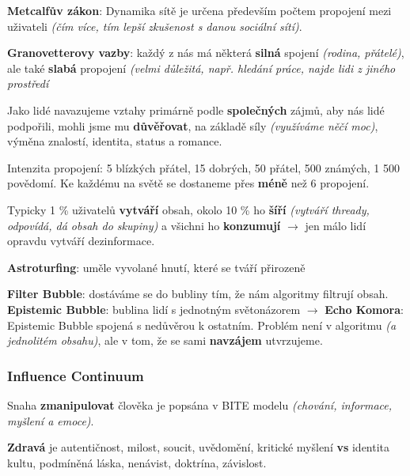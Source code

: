 \vspace{4pt}
\noindent \textbf{Metcalfův zákon}: Dynamika sítě je určena především počtem propojení mezi uživateli \textit{(čím více, tím lepší zkušenost s danou sociální sítí)}.

\vspace{4pt}
\noindent \textbf{Granovetterovy vazby}: každý z nás má některá \textbf{silná} spojení \textit{(rodina, přátelé)}, ale také \textbf{slabá} propojení \textit{(velmi důležitá, např. hledání práce, najde lidi z jiného prostředí}

\vspace{4pt}
\noindent Jako lidé navazujeme vztahy primárně podle \textbf{společných} zájmů, aby nás lidé podpořili, mohli jsme mu \textbf{důvěřovat}, na základě síly \textit{(využíváme něčí moc)}, výměna znalostí, identita, status a romance.

\vspace{4pt}
\noindent Intenzita propojení: 5 blízkých přátel, 15 dobrých, 50 přátel, 500 známých, 1 500 povědomí. Ke každému na světě se dostaneme přes \textbf{méně} než 6 propojení.

\vspace{4pt}
\noindent Typicky 1 \% uživatelů \textbf{vytváří} obsah, okolo 10 \% ho \textbf{šíří} \textit{(vytváří thready, odpovídá, dá obsah do skupiny)} a všichni ho \textbf{konzumují} $\to$ jen málo lidí opravdu vytváří dezinformace.

\vspace{4pt}
\noindent \textbf{Astroturfing}: uměle vyvolané hnutí, které se tváří přirozeně

\vspace{4pt}
\noindent \textbf{Filter Bubble}: dostáváme se do bubliny tím, že nám algoritmy filtrují obsah. \textbf{Epistemic Bubble}: bublina lidí s jednotným světonázorem $\to$ \textbf{Echo Komora}: Epistemic Bubble spojená s nedůvěrou k ostatním. Problém není v algoritmu \textit{(a jednolitém obsahu)}, ale v tom, že se sami \textbf{navzájem} utvrzujeme.

\subsubsection*{Influence Continuum}

Snaha \textbf{zmanipulovat} člověka je popsána v BITE modelu \textit{(chování, informace, myšlení a emoce)}.

\textbf{Zdravá} je autentičnost, milost, soucit, uvědomění, kritické myšlení \textbf{vs} identita kultu, podmíněná láska, nenávist, doktrína, závislost.

